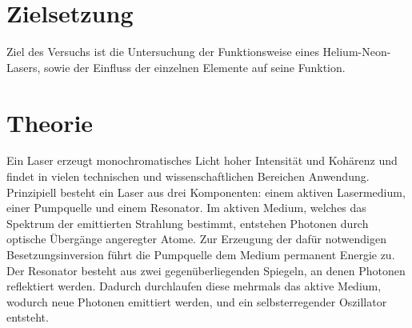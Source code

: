 



\maketitle

\section{Zielsetzung}
Ziel des Versuchs ist die Untersuchung der Funktionsweise eines Helium-Neon-Lasers, sowie der Einfluss 
der einzelnen Elemente auf seine Funktion.

\section{Theorie}
Ein Laser erzeugt monochromatisches Licht hoher Intensität und Kohärenz und findet in vielen technischen 
und wissenschaftlichen Bereichen Anwendung.
Prinzipiell besteht ein Laser aus drei Komponenten: einem aktiven Lasermedium, 
einer Pumpquelle und einem Resonator. 
Im aktiven Medium, welches das Spektrum der emittierten Strahlung bestimmt, 
entstehen Photonen durch optische Übergänge angeregter Atome. Zur Erzeugung der dafür notwendigen Besetzungsinversion 
führt die Pumpquelle dem Medium permanent Energie zu.
Der Resonator besteht aus zwei gegenüberliegenden Spiegeln, an denen Photonen reflektiert werden. Dadurch durchlaufen
diese mehrmals das aktive Medium, wodurch neue Photonen emittiert werden, und ein selbsterregender Oszillator entsteht.


